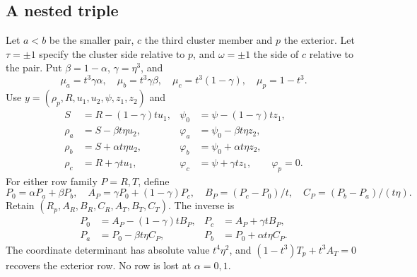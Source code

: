 \documentclass[11pt,a4paper]{article}
\numberwithin{equation}{section}
\theoremstyle{remark}
\begin{document}
\subsection{A nested triple}
\label{subsec:nested}
Let $a<b$ be the smaller pair, $c$ the third cluster member and $p$ the exterior. Let $\tau=\pm1$ specify the cluster side relative to $p$, and $\omega=\pm1$ the side of $c$ relative to the pair. Put $\beta=1-\alpha$, $\gamma=\eta^3$, and
\begin{equation}\label{eq:nest-masses}
 \mu_a=t^3\gamma\alpha,\quad\mu_b=t^3\gamma\beta,\quad
 \mu_c=t^3(1-\gamma),\quad\mu_p=1-t^3.
\end{equation}
Use $y=(\rho_p,R,u_1,u_2,\psi,z_1,z_2)$ and
\begin{equation}\label{eq:nest-coordinates}
 \begin{aligned}
 S&=R-(1-\gamma)tu_1,&\psi_0&=\psi-(1-\gamma)tz_1,\\
 \rho_a&=S-\beta t\eta u_2,&\varphi_a&=\psi_0-\beta t\eta z_2,\\
 \rho_b&=S+\alpha t\eta u_2,&\varphi_b&=\psi_0+\alpha t\eta z_2,\\
 \rho_c&=R+\gamma tu_1,&\varphi_c&=\psi+\gamma tz_1,\qquad\varphi_p=0.
 \end{aligned}
\end{equation}
For either row family $P=R,T$, define
\begin{equation}\label{eq:nest-rows}
 P_0=\alpha P_a+\beta P_b,\quad
 A_P=\gamma P_0+(1-\gamma)P_c,\quad
 B_P=(P_c-P_0)/t,\quad C_P=(P_b-P_a)/(t\eta).
\end{equation}
Retain $(R_p,A_R,B_R,C_R,A_T,B_T,C_T)$. The inverse is
\begin{equation}\label{eq:nest-recovery}
 \begin{aligned}
 P_0&=A_P-(1-\gamma)tB_P,&P_c&=A_P+\gamma tB_P,\\
 P_a&=P_0-\beta t\eta C_P,&P_b&=P_0+\alpha t\eta C_P.
 \end{aligned}
\end{equation}
The coordinate determinant has absolute value $t^4\eta^2$, and $(1-t^3)T_p+t^3A_T=0$ recovers the exterior row. No row is lost at $\alpha=0,1$.
\end{document}
